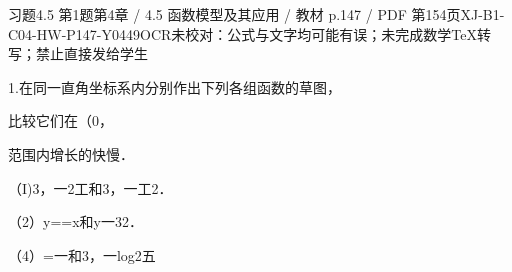 \begin{bankitem}{习题4.5 第1题}{第4章 / 4.5 函数模型及其应用 / 教材 p.147 / PDF 第154页}{XJ-B1-C04-HW-P147-Y0449}{OCR未校对：公式与文字均可能有误；未完成数学TeX转写；禁止直接发给学生}
\begin{ocrdraft}
\par
1.在同一直角坐标系内分别作出下列各组函数的草图，
\par
比较它们在（0，
\par
范围内增长的快慢．
\par
（I)3，一2工和3，一工2．
\par
（2）y==x和y一32．
\par
（4）=一和3，一log2五
\end{ocrdraft}
\end{bankitem}
